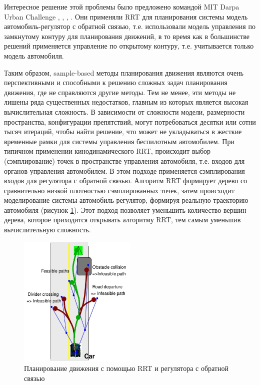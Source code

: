 Интересное решение этой проблемы было предложено командой MIT Darpa Urban Challenge \cite{darpa_mit}, \cite{darpa_mit_2},
\cite{darpa_mit_3}, \cite{darpa_mit_3}. Они применяли RRT для планирования
системы модель автомобиль-регулятор с обратной связью, т.е. использовали модель управления по замкнутому контуру для
планирования движений, в то время как в большинстве решений применяется управление по открытому контуру, т.е.
учитывается только модель автомобиля.


Таким образом, sample-based методы планирования движения являются очень перспективными и способными к решению
сложных задач планирования движения, где не справляются другие методы. Тем не менее, эти методы не лишены ряда
существенных недостатков, главным из которых является высокая вычислительная сложность. В зависимости от сложности
модели, размерности пространства, конфигурации препятствий, могут потребоваться десятки или сотни тысяч итераций,
чтобы найти решение, что может не укладываться в жесткие временные рамки для системы управления беспилотным
автомобилем. При типичном применении кинодинамического RRT, происходит выбор (сэмплирование) точек в пространстве
управления автомобиля, т.е. входов для органов управления автомобилем. В этом подходе применяется сэмплирования
входов для регулятора с обратной связью. Алгоритм RRT формирует дерево со сравнительно низкой плотностью сэмплированных
точек, затем происходит моделирование системы автомобиль-регулятор, формируя реальную траекторию автомобиля (рисунок
\ref{img:darpa_mit_rrt}). Этот подход позволяет уменьшить количество вершин дерева, которое приходится открывать
алгоритму RRT, тем самым уменьшив вычислительную сложность.

\begin{figure}[h]
    \centering
    \includegraphics[width=0.5\textwidth]{images/darpa_mit_rrt}
    \caption{Планирование движения с помощью RRT и регулятора с обратной связью}
    \label{img:darpa_mit_rrt}
\end{figure}


